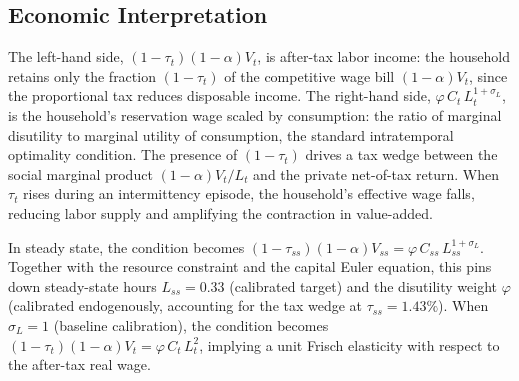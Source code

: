 \documentclass[12pt, a4paper]{article}
\begin{document}
	\subsection*{Economic Interpretation}
	
	The left-hand side, $(1-\tau_t)(1-\alpha)V_t$, is after-tax labor income: the household retains only the fraction $(1-\tau_t)$ of the competitive wage bill $(1-\alpha)V_t$, since the proportional tax reduces disposable income. The right-hand side, $\varphi\,C_t\,L_t^{1+\sigma_L}$, is the household's reservation wage scaled by consumption: the ratio of marginal disutility to marginal utility of consumption, the standard intratemporal optimality condition. The presence of $(1-\tau_t)$ drives a tax wedge between the social marginal product $(1-\alpha)V_t/L_t$ and the private net-of-tax return. When $\tau_t$ rises during an intermittency episode, the household's effective wage falls, reducing labor supply and amplifying the contraction in value-added.
	
	In steady state, the condition becomes $(1-\tau_{ss})(1-\alpha)V_{ss} = \varphi\,C_{ss}\,L_{ss}^{1+\sigma_L}$. Together with the resource constraint and the capital Euler equation, this pins down steady-state hours $L_{ss} = 0.33$ (calibrated target) and the disutility weight $\varphi$ (calibrated endogenously, accounting for the tax wedge at $\tau_{ss} = 1.43\%$). When $\sigma_L = 1$ (baseline calibration), the condition becomes $(1-\tau_t)(1-\alpha)V_t = \varphi\,C_t\,L_t^2$, implying a unit Frisch elasticity with respect to the after-tax real wage.
	
\end{document}

